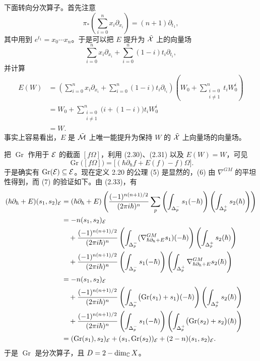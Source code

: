 
下面转向分次算子。首先注意
\begin{equation}
  \pi_*\left(\sum_{i=0}^{n}x_i\partial_{x_i}\right)=(n+1)\partial_{t_1}, \tag{2.34}
\end{equation}
其中用到 $e^{t_1}=x_0\cdots x_n$。于是可以把 $E$ 提升为 $\tilde{\mathcal{X}}$ 上的向量场
\[
  \sum_{i=0}^{n}x_i\partial_{x_i}+\sum_{i=0}^{n}(1-i)t_i\partial_{t_i},
\]
并计算
\begin{align*}
  E(W)&=\left(\sum_{i=0}^{n}x_i\partial_{x_i}+\sum_{i=0}^{n}(1-i)t_i\partial_{t_i}\right)
  \left(W_0+\sum_{\substack{i=0\\ i\ne1}}^{n}t_iW_0^{i}\right)\\
  &=W_0+\sum_{\substack{i=0\\ i\ne1}}^{n}\bigl(i+(1-i)\bigr)t_iW_0^{i}\\
  &=W.
\end{align*}
事实上容易看出，$E$ 是 $\tilde{\mathcal{M}}$ 上唯一能提升为保持 $W$ 的 $\tilde{\mathcal{X}}$ 上向量场的向量场。

把 $\operatorname{Gr}$ 作用于 $\mathcal{E}$ 的截面 $[f\Omega]$，利用 (2.30)、(2.31) 以及 $E(W)=W$，可见
\[
  \operatorname{Gr}\bigl([f\Omega]\bigr)
  =\bigl[(\hbar\partial_\hbar f+E(f)-f)\Omega\bigr].
\]
于是确实有 $\operatorname{Gr}(\mathcal{E})\subseteq\mathcal{E}$。现在定义 2.20 的公理 (5) 是显然的，(6) 由 $\nabla^{GM}$ 的平坦性得到，而 (7) 的验证如下。由 (2.33)，有
\begin{align*}
  (\hbar\partial_\hbar+E)(s_1,s_2)_{\mathcal{E}}
  &=(\hbar\partial_\hbar+E)\left(\frac{(-1)^{n(n+1)/2}}{(2\pi i\hbar)^n}
  \sum_p\left(\int_{\Delta^-_p}s_1(-\hbar)\right)\left(\int_{\Delta^+_p}s_2(\hbar)\right)\right)\\
  &=-n(s_1,s_2)_{\mathcal{E}}\\
  &\quad+\frac{(-1)^{n(n+1)/2}}{(2\pi i\hbar)^n}
  \left(\int_{\Delta^-_p}(\nabla^{GM}_{\hbar\partial_\hbar+E}s_1)(-\hbar)\right)
  \left(\int_{\Delta^+_p}s_2(\hbar)\right)\\
  &\quad+\frac{(-1)^{n(n+1)/2}}{(2\pi i\hbar)^n}
  \left(\int_{\Delta^-_p}s_1(-\hbar)\right)
  \left(\int_{\Delta^+_p}\nabla^{GM}_{\hbar\partial_\hbar+E}s_2(\hbar)\right)\\
  &=-n(s_1,s_2)_{\mathcal{E}}\\
  &\quad+\frac{(-1)^{n(n+1)/2}}{(2\pi i\hbar)^n}
  \left(\int_{\Delta^-_p}\bigl(\operatorname{Gr}(s_1)+s_1\bigr)(-\hbar)\right)
  \left(\int_{\Delta^+_p}s_2(\hbar)\right)\\
  &\quad+\frac{(-1)^{n(n+1)/2}}{(2\pi i\hbar)^n}
  \left(\int_{\Delta^-_p}s_1(-\hbar)\right)
  \left(\int_{\Delta^+_p}\bigl(\operatorname{Gr}(s_2)+s_2\bigr)(\hbar)\right)\\
  &=(\operatorname{Gr}(s_1),s_2)_{\mathcal{E}}+(s_1,\operatorname{Gr}(s_2))_{\mathcal{E}}+(2-n)(s_1,s_2)_{\mathcal{E}}.
\end{align*}
于是 $\operatorname{Gr}$ 是分次算子，且 $D=2-\dim_{\mathbb{C}} X$。

